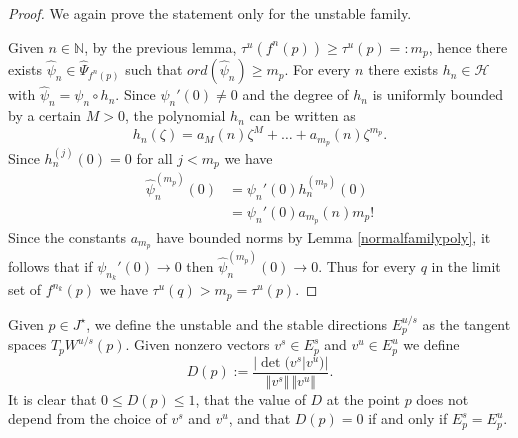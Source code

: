 \documentclass[10pt,a4paper]{article}
\begin{document}
\begin{proof}
We again prove the statement only for the unstable family.

Given $n\in\mathbb N$, by the previous lemma, $\tau^u(f^n(p))\geq \tau^u(p)=:m_p$, hence there exists $\widehat\psi_n\in\widehat \Psi_{f^n(p)}$ such that $ord(\widehat\psi_n)\geq m_p$. For every $n$ there exists $h_n\in \mathcal H$ with $\widehat\psi_n=\psi_n\circ h_n$. Since $\psi_n'(0)\neq 0 $ and the degree of $h_n$ is uniformly bounded by a certain $M>0$, the polynomial $h_n$ can be written as
\[
h_n(\zeta)=a_M(n)\zeta^M+\dots+a_{m_p}(n)\zeta^{m_p}.
\]
Since $h_n^{(j)}(0) = 0$ for all $j < m_p$ we have
\begin{align*}
\widehat\psi_n^{(m_p)}(0)&=\psi_n'(0)h_n^{(m_p)}(0)\\
&=\psi_n'(0)a_{m_p}(n)m_p!
\end{align*}
Since the constants $a_{m_p}$ have bounded norms by Lemma \ref{normalfamilypoly}, it follows that if $\psi_{n_k}'(0)\to 0$ then $\widehat \psi_n^{(m_p)}(0) \rightarrow 0$. Thus for every $q$ in the limit set of $f^{n_k}(p)$ we have $\tau^u(q) > m_p =  \tau^u(p)$.
\end{proof}

Given $p\in J^\star$, we define the unstable and the stable directions $E^{u/s}_p$ as the tangent spaces $T_pW^{u/s}(p)$. Given nonzero vectors $v^s\in E^s_p$ and $v^u\in E^u_p$ we define
\[
D(p):=\frac{|\det(v^s|v^u)|}{\Vert v^s\Vert\,\Vert v^u\Vert}.
\]
It is clear that $0\leq D(p)\leq 1$, that the value of $D$ at the point $p$ does not depend from the choice of $v^s$ and $v^u$, and that $D(p)=0$ if and only if $E^s_p=E^u_p$.
\end{document}
